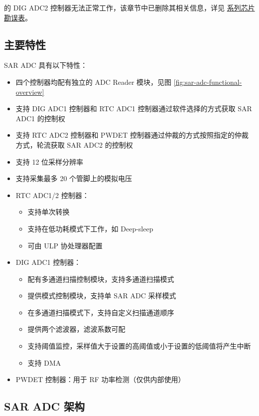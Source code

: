 \documentclass[main\_\_CN.tex]{subfiles}
\begin{document}
\begin{tiplisting}
\chipname{} 的 DIG ADC2 控制器无法正常工作，该章节中已删除其相关信息，详见 \href{\linkprefix\linkchiperrataCN}{\chipseries{} 系列芯片勘误表}。
\end{tiplisting}

\subsection{主要特性}
SAR ADC 具有以下特性：
\begin{itemize}
\item 四个控制器均配有独立的 ADC Reader 模块，见图 \ref{fig:sar-adc-functional-overview}
\item 支持 DIG ADC1 控制器和 RTC ADC1 控制器通过软件选择的方式获取 SAR ADC1 的控制权
\item 支持 RTC ADC2 控制器和 PWDET 控制器通过仲裁的方式按照指定的仲裁方式，轮流获取 SAR ADC2 的控制权
\item 支持 12 位采样分辨率
\item 支持采集最多 20 个管脚上的模拟电压
\item{RTC ADC1/2 控制器：}
    \begin{itemize}
        \item{支持单次转换}
        \item{支持在低功耗模式下工作，如 Deep-sleep}
        \item{可由 ULP 协处理器配置}
    \end{itemize}
\item DIG ADC1 控制器：
    \begin{itemize}
        \item 配有多通道扫描控制模块，支持多通道扫描模式
        \item 提供模式控制模块，支持单 SAR ADC 采样模式
        \item 在多通道扫描模式下，支持自定义扫描通道顺序
        \item 提供两个滤波器，滤波系数可配
        \item 支持阈值监控，采样值大于设置的高阈值或小于设置的低阈值将产生中断
        \item 支持 DMA
    \end{itemize}
\item PWDET 控制器：用于 RF 功率检测（仅供内部使用）
\end{itemize}


\subsection{SAR ADC 架构}
\end{document}
